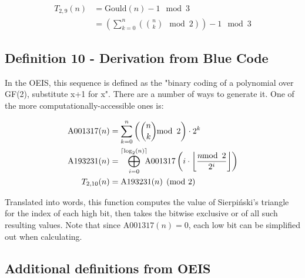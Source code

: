 \documentclass[conference]{IEEEtran}
\begin{document}
\begin{equation}
    \begin{aligned}
T_{2,9}(n) &= \text{Gould}(n) - 1 \mod{3} \\
           &= \left(\sum_{k=0}^n \left(\binom{n}{k} \mod{2} \right)\right) - 1 \mod{3}
    \end{aligned}
\end{equation}

\subsection{Definition 10 - Derivation from Blue Code}


In the OEIS, this sequence \cite{OEIS-A193231} is defined as the "binary coding of a polynomial over GF(2), substitute x+1 for x". There are a number of ways to generate it. One of the more computationally-accessible ones is:

\begin{equation}
    \begin{aligned}
\text{A001317}(n) &= \sum_{k=0}^n \left(\binom{n}{k} \mod{2} \right) \cdot 2^k \\
\text{A193231}(n) &= \bigoplus_{i=0}^{\ceil{\log_2(n)}} \hspace{-5pt} \text{A001317}\left(i \cdot \floor{\dfrac{n \mod{2}}{2^i}}\right) \\
      T_{2,10}(n) &= \text{A193231}(n) \pmod{2}
    \end{aligned}
\end{equation}

Translated into words, this function computes the value of Sierpiński's triangle for the index of each high bit, then takes the bitwise exclusive or of all such resulting values. Note that since $\text{A001317}(n) = 0$, each low bit can be simplified out when calculating.


\subsection{Additional definitions from OEIS}

\end{document}
